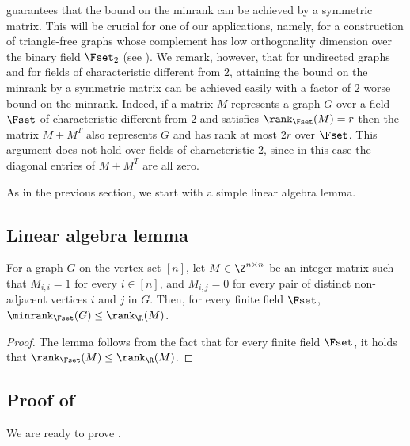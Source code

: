 \begin{remark}\label{remark:symmetric}
 guarantees that the bound on the minrank can be achieved by a symmetric matrix.
This will be crucial for one of our applications, namely, for a construction of triangle-free graphs whose complement has low orthogonality dimension over the binary field $\Fset_2$ (see ).
We remark, however, that for undirected graphs and for fields of characteristic different from $2$, attaining the bound on the minrank by a symmetric matrix can be achieved easily with a factor of $2$ worse bound on the minrank. Indeed, if a matrix $M$ represents a graph $G$ over a field $\Fset$ of characteristic different from $2$ and satisfies ${\rank}_{\Fset}(M) = r$ then the matrix $M+M^T$ also represents $G$ and has rank at most $2r$ over $\Fset$.
This argument does not hold over fields of characteristic $2$, since in this case the diagonal entries of $M+M^T$ are all %
zero.  %
\end{remark}

As in the previous section, we start with a simple linear algebra lemma.

\subsection{Linear algebra lemma}

\begin{lemma}\label{lemma:rankp_R}
  For a graph $G$ on the vertex set $[n]$, let $M \in \Z^{n \times n}$ be an integer matrix such that $M_{i,i}=1$ for every $i \in [n]$, and $M_{i,j} = 0$ for every
pair of  %
distinct non-adjacent vertices $i$ and $j$ in $G$. Then, for every finite field $\Fset$, ${\minrank}_{\Fset}(G) \leq \rank_\R(M)$.
\end{lemma}

%
\begin{proof}
The lemma follows from the fact that for every finite field $\Fset$, it holds that $\rank_{\Fset} (M) \leq \rank_{\R} (M)$.
\end{proof}

%
%
%
%
%
%
%
%
%
%
%
%
%
%
%
%
%
%
%
%
%
%
%
%
%
%
%
%
%
%
%

\subsection{Proof of }

We are ready to prove .

